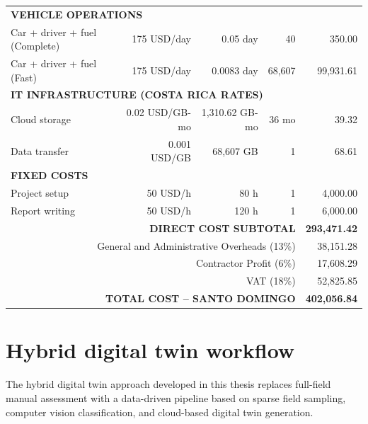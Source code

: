 \begin{longtable}{lrrrr}
\multicolumn{5}{l}{\textbf{VEHICLE OPERATIONS}} \\

Car + driver + fuel (Complete) & 175 USD/day & 0.05 day & 40 & 350.00 \\
Car + driver + fuel (Fast) & 175 USD/day & 0.0083 day & 68,607 & 99,931.61 \\
\hline

\multicolumn{5}{l}{\textbf{IT INFRASTRUCTURE (COSTA RICA RATES)}} \\

Cloud storage & 0.02 USD/GB-mo & 1,310.62 GB-mo & 36 mo & 39.32 \\
Data transfer & 0.001 USD/GB & 68,607 GB & 1 & 68.61 \\
\hline

\multicolumn{5}{l}{\textbf{FIXED COSTS}} \\

Project setup & 50 USD/h & 80 h & 1 & 4,000.00 \\
Report writing & 50 USD/h & 120 h & 1 & 6,000.00 \\
\hline

\multicolumn{4}{r}{\textbf{DIRECT COST SUBTOTAL}} & \textbf{293,471.42} \\
\hline

\multicolumn{4}{r}{General and Administrative Overheads (13\%)} & 38,151.28 \\
\multicolumn{4}{r}{Contractor Profit (6\%)} & 17,608.29 \\
\multicolumn{4}{r}{VAT (18\%)} & 52,825.85 \\
\hline

\multicolumn{4}{r}{\textbf{TOTAL COST – SANTO DOMINGO}} & \textbf{402,056.84} \\
\hline

\end{longtable}













\renewcommand{\sectionnametext}{Hybrid digital twin workflow}
\renewcommand{\headingtextR}{\thesection. \sectionnametext}
\section{\sectionnametext}

The hybrid digital twin approach developed in this thesis replaces full-field manual assessment with a data-driven pipeline based on sparse field sampling, computer vision classification, and cloud-based digital twin generation.

